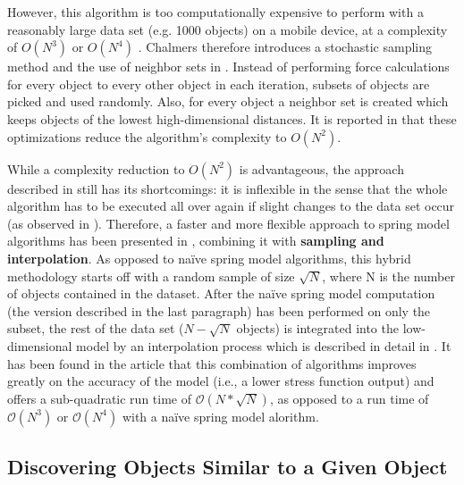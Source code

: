 However, this algorithm is too computationally expensive to perform with a reasonably large data set (e.g. 1000 objects) on a mobile device, at a complexity of $O(N^3)$ or $O(N^4)$ \cite{Chalmers:1996:LIT:244979.245035}. Chalmers therefore introduces a stochastic sampling method and the use of neighbor sets in \cite{Chalmers:1996:LIT:244979.245035}. Instead of performing force calculations for every object to every other object in each iteration, subsets of objects are picked and used randomly. Also, for every object a neighbor set is created which keeps objects of the lowest high-dimensional distances. It is reported in \cite{Chalmers:1996:LIT:244979.245035} that these optimizations reduce the algorithm's complexity to $O(N^2)$.

While a complexity reduction to $O(N^2)$ is advantageous, the approach described in \cite{Chalmers:1996:LIT:244979.245035} still has its shortcomings: it is inflexible in the sense that the whole algorithm has to be executed all over again if slight changes to the data set occur (as observed in \cite{Morrison:2003:FMS}). Therefore, a faster and more flexible approach to spring model algorithms has been presented in \cite{Morrison:2003:FMS}, combining it with \textbf{sampling and interpolation}. As opposed to naïve spring model algorithms, this hybrid methodology starts off with a random sample of size $\sqrt{N}$, where N is the number of objects contained in the dataset. After the naïve spring model computation (the version described in the last paragraph) has been performed on only the subset, the rest of the data set ($N - \sqrt{N}$ objects) is integrated into the low-dimensional model by an interpolation process which is described in detail in \cite{Morrison:2003:FMS}. It has been found in the article that this combination of algorithms improves greatly on the accuracy of the model (i.e., a lower stress function output) and offers a sub-quadratic run time of $\mathcal O(N*\sqrt{N})$, as opposed to a run time of $\mathcal O(N^3)$ or $\mathcal O(N^4)$ with a naïve spring model alorithm.


\subsection{Discovering Objects Similar to a Given Object}

